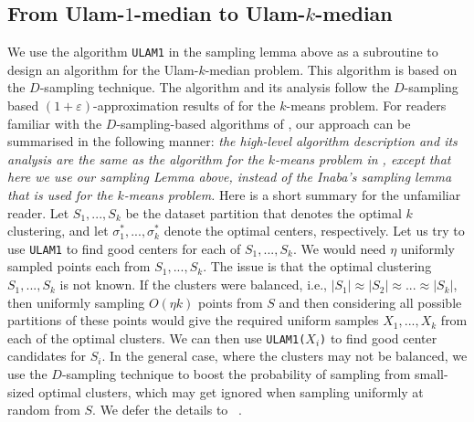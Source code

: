 \documentclass[11pt]{llncs}
\newcommand{\veps}{\varepsilon}
\begin{document}
\subsection{From Ulam-$1$-median to Ulam-$k$-median}
We use the algorithm {\tt ULAM1} in the sampling lemma above as a subroutine to design an algorithm for the Ulam-$k$-median problem.
This algorithm is based on the $D$-sampling technique.
The algorithm and its analysis follow the $D$-sampling based $(1+\veps)$-approximation results of \cite{jks} for the $k$-means problem.
For readers familiar with the $D$-sampling-based algorithms of \cite{jks}, our approach can be summarised in the following manner: {\it the high-level algorithm description and its analysis are the same as the algorithm for the $k$-means problem in \cite{jks}, except that here we use our sampling Lemma above, instead of the Inaba's sampling lemma~\cite{inaba} that is used for the $k$-means problem.}
Here is a short summary for the unfamiliar reader.
Let $S_1, ..., S_k$ be the dataset partition that denotes the optimal $k$ clustering, and let $\sigma^*_1, ..., \sigma^*_k$ denote the optimal centers, respectively. Let us try to use {\tt ULAM1} to find good centers for each of $S_1, ..., S_k$. We would need $\eta$ uniformly sampled points each from $S_1, ..., S_k$. 
The issue is that the optimal clustering $S_1, ..., S_k$ is not known.
If the clusters were balanced, i.e., $|S_1| \approx |S_2| \approx ... \approx |S_k|$, then uniformly sampling $O(\eta k)$ points from $S$ and then considering all possible partitions of these points would give the required uniform samples $X_1, ..., X_k$ from each of the optimal clusters. We can then use {\tt ULAM1($X_i$)} to find good center candidates for $S_i$. 
In the general case, where the clusters may not be balanced, we use the $D$-sampling technique to boost the probability of sampling from small-sized optimal clusters, which may get ignored when sampling uniformly at random from $S$. We defer the details to ~. 
\end{document}
